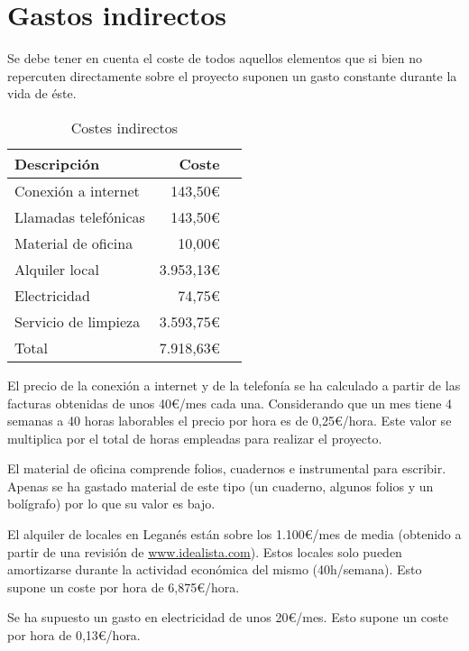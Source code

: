 \section{Gastos indirectos}

Se debe tener en cuenta el coste de todos aquellos elementos que si bien no repercuten directamente sobre el proyecto suponen un gasto constante durante la vida de éste.

\begin{table}
	\centering
	
	\begin{tabular}{|l|r|r|}
		\hline
		Descripción & Coste \\
		\hline
		Conexión a internet & 143,50\euro \\
		\hline
		Llamadas telefónicas & 143,50\euro \\
		\hline
		Material de oficina & 10,00\euro\\
		\hline
		Alquiler local & 3.953,13\euro\\
		\hline
		Electricidad & 74,75\euro\\
		\hline
		Servicio de limpieza & 3.593,75\euro\\
		
		\hline
		\hline
		Total & 7.918,63\euro\\
		\hline
	\end{tabular}
	\caption{Costes indirectos}\label{tab:cost_indi}
\end{table}

El precio de la conexión a internet y de la telefonía se ha calculado a partir de las facturas obtenidas de unos 40\euro/mes cada una. Considerando que un mes tiene 4 semanas a 40 horas laborables el precio por hora es de 0,25\euro/hora. Este valor se multiplica por el total de horas empleadas para realizar el proyecto.

El material de oficina comprende folios, cuadernos e instrumental para escribir. Apenas se ha gastado material de este tipo (un cuaderno, algunos folios y un bolígrafo) por lo que su valor es bajo.

El alquiler de locales en Leganés están sobre los 1.100\euro/mes de media (obtenido a partir de una revisión de \url{www.idealista.com}). Estos locales solo pueden amortizarse durante la actividad económica del mismo (40h/semana). Esto supone un coste por hora de 6,875\euro/hora.

Se ha supuesto un gasto en electricidad de unos 20\euro/mes. Esto supone un coste por hora de 0,13\euro/hora.

